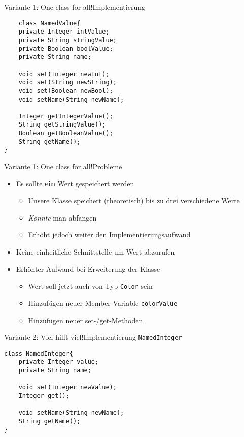 \begin{frame}[fragile]{Variante 1: One class for all!}{Implementierung}
\lstset{style=javacode}
\begin{lstlisting}
    class NamedValue{
    private Integer intValue;
    private String stringValue;
    private Boolean boolValue;
    private String name;

    void set(Integer newInt);
    void set(String newString);
    void set(Boolean newBool);
    void setName(String newName);

    Integer getIntegerValue();
    String getStringValue();
    Boolean getBooleanValue();
    String getName();
}
\end{lstlisting}
\end{frame}

\begin{frame}{Variante 1: One class for all!}{Probleme}
    \begin{itemize}
        \item Es sollte \textbf{ein} Wert gespeichert werden
            \begin{itemize}
                \item Unsere Klasse speichert (theoretisch) bis zu drei verschiedene Werte
                \item \textit{Könnte} man abfangen
                \item Erhöht jedoch weiter den Implementierungsaufwand
            \end{itemize}
            \item Keine einheitliche Schnittstelle um Wert abzurufen
            \item Erhöhter Aufwand bei Erweiterung der Klasse
            \begin{itemize}
                \item Wert soll jetzt auch von Typ \texttt{Color} sein
                \item Hinzufügen neuer Member Variable \texttt{colorValue}
                \item Hinzufügen neuer set-/get-Methoden
            \end{itemize}
    \end{itemize}
\end{frame}

\begin{frame}[fragile]{Variante 2: Viel hilft viel!}{Implementierung \texttt{NamedInteger}}
\begin{lstlisting}
class NamedInteger{
    private Integer value;
    private String name;
    
    void set(Integer newValue);
    Integer get();
    
    void setName(String newName);
    String getName();
}
\end{lstlisting}
\end{frame}

